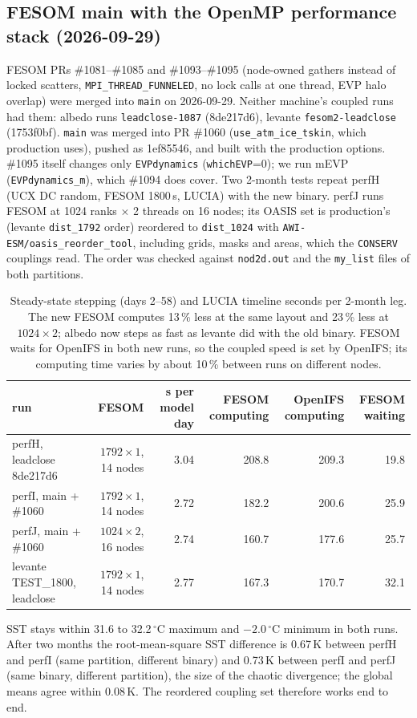 \documentclass[11pt,a4paper]{article}
\begin{document}
\subsection{FESOM main with the OpenMP performance stack (2026-09-29)}
FESOM PRs \#1081--\#1085 and \#1093--\#1095 (node-owned gathers instead of locked scatters, \texttt{MPI\_THREAD\_FUNNELED}, no lock calls at one thread, EVP halo overlap) were merged into \texttt{main} on 2026-09-29. Neither machine's coupled runs had them: albedo runs \texttt{leadclose-1087} (8de217d6), levante \texttt{fesom2-leadclose} (1753f0bf). \texttt{main} was merged into PR \#1060 (\texttt{use\_atm\_ice\_tskin}, which production uses), pushed as 1ef85546, and built with the production options. \#1095 itself changes only \texttt{EVPdynamics} (\texttt{whichEVP}=0); we run mEVP (\texttt{EVPdynamics\_m}), which \#1094 does cover. Two 2-month tests repeat perfH (UCX DC random, FESOM 1800\,s, LUCIA) with the new binary. perfJ runs FESOM at 1024 ranks $\times$ 2 threads on 16 nodes; its OASIS set is production's (levante \texttt{dist\_1792} order) reordered to \texttt{dist\_1024} with \texttt{AWI-ESM/oasis\_reorder\_tool}, including grids, masks and areas, which the \texttt{CONSERV} couplings read. The order was checked against \texttt{nod2d.out} and the \texttt{my\_list} files of both partitions.
\begin{table}[H]\centering\small
\begin{tabular}{lrrrrr}\toprule
run & FESOM & s per model day & FESOM computing & OpenIFS computing & FESOM waiting\\\midrule
perfH, leadclose 8de217d6 & $1792\times1$, 14 nodes & 3.04 & 208.8 & 209.3 & 19.8\\
perfI, main + \#1060 & $1792\times1$, 14 nodes & 2.72 & 182.2 & 200.6 & 25.9\\
perfJ, main + \#1060 & $1024\times2$, 16 nodes & 2.74 & 160.7 & 177.6 & 25.7\\
levante TEST\_1800, leadclose & $1792\times1$, 14 nodes & 2.77 & 167.3 & 170.7 & 32.1\\\bottomrule
\end{tabular}
\caption{Steady-state stepping (days 2--58) and LUCIA timeline seconds per 2-month leg. The new FESOM computes 13\,\% less at the same layout and 23\,\% less at $1024\times2$; albedo now steps as fast as levante did with the old binary. FESOM waits for OpenIFS in both new runs, so the coupled speed is set by OpenIFS; its computing time varies by about 10\,\% between runs on different nodes.}\label{tab:perfIJ}
\end{table}
SST stays within 31.6 to 32.2\,$^\circ$C maximum and $-2.0$\,$^\circ$C minimum in both runs. After two months the root-mean-square SST difference is 0.67\,K between perfH and perfI (same partition, different binary) and 0.73\,K between perfI and perfJ (same binary, different partition), the size of the chaotic divergence; the global means agree within 0.08\,K. The reordered coupling set therefore works end to end.
\end{document}
